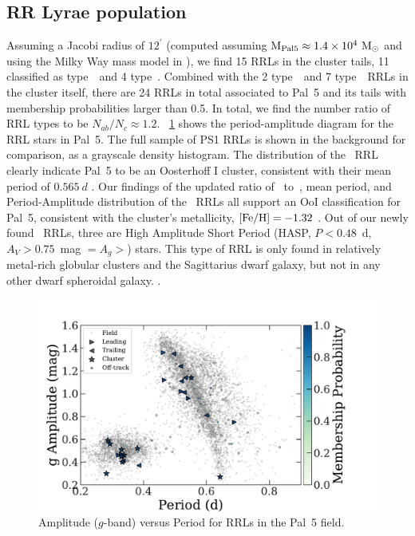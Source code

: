\documentclass[twocolumn]{aastex63}
\begin{document}
\subsection{RR Lyrae population }


Assuming a Jacobi radius of $12^\prime$ (computed assuming $\textrm{M}_{\rm Pal 5} \approx 1.4\times10^4~\mathrm{M}_\odot$ and using the Milky Way mass model in \citealt{gala}), we find 15 RRLs in the cluster tails, 11 classified as type~\typeab\ and 4 type~\typec.
Combined with the 2 type~\typeab\ and 7 type~\typec\ RRLs in the cluster itself, there are 24 RRLs in total associated to Pal~5 and its tails with membership probabilities larger than 0.5.
In total, we find the number ratio of RRL types to be $N_{ab} / N_{c} \approx 1.2$.
\figurename~\ref{fig:PA_diagram} shows the period-amplitude diagram for the RRL stars in Pal~5.
The full sample of PS1 RRLs is shown in the background for comparison, as a grayscale density histogram. The distribution of the \typeab~RRL clearly indicate Pal~5 to be an Oosterhoff I cluster, consistent with their mean period of $0.565~d$ .
Our findings of the updated ratio of \rrab~to~\rrc, mean period, and Period-Amplitude distribution of the \rrab\ RRLs all support an OoI classification for Pal~5, consistent with the cluster's metallicity, $[\mathrm{Fe}/\mathrm{H}]=-1.32$ \citep{TODO}.
Out of our newly found \rrab\ RRLs, three are High Amplitude Short Period (HASP, $P <0.48$~d, $A_V>0.75$~mag $=A_g>$) stars.
This type of RRL is only found in relatively metal-rich globular clusters  \citep[$\FeH>-1.5$;][]{Monelli:2017} and the Sagittarius dwarf galaxy, but not in any other dwarf spheroidal galaxy. .


\begin{figure}[t]
\begin{center}
\includegraphics[width=\textwidth]{rrls_PA.pdf}
\caption{Amplitude ($g$-band) versus Period for RRLs in the Pal~5 field.}
\label{fig:PA_diagram}
\end{center}
\end{figure}
\end{document}
